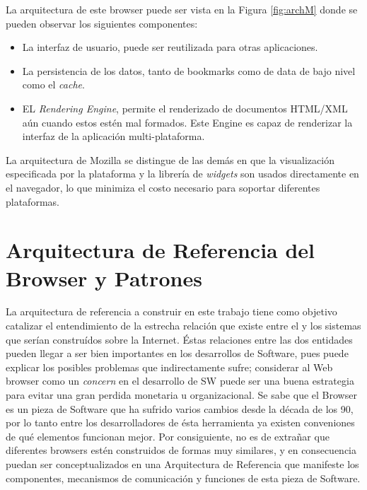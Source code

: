     La arquitectura de este browser puede ser vista en la Figura \ref{fig:archM} donde se pueden observar los siguientes componentes:
            \begin{itemize}
                \item La interfaz de usuario, puede ser reutilizada para otras aplicaciones.
                \item La persistencia de los datos, tanto de bookmarks como de data de bajo nivel como el \textit{cache}.
                \item EL \textit{Rendering Engine}, permite el renderizado de documentos HTML/XML aún cuando estos estén mal formados. Este Engine es capaz de renderizar la interfaz de la aplicación multi-plataforma.
            \end{itemize}
    La arquitectura de Mozilla se distingue de las demás en que la visualización especificada por la plataforma y la librería de \textit{widgets} son usados directamente en el navegador, lo que minimiza el costo necesario para soportar diferentes plataformas.
            




\section{Arquitectura de Referencia del Browser y Patrones}
\label{chap3:ArqRefBrowandPatt}


La arquitectura de referencia a construir en este trabajo tiene como objetivo catalizar el entendimiento de la estrecha relación que existe entre el \cite{Web Browser} y los sistemas que serían construídos sobre la Internet. Éstas relaciones entre las dos entidades pueden llegar a ser bien importantes en los desarrollos de Software, pues puede explicar los posibles problemas que indirectamente sufre; considerar al Web browser como un \textit{concern} en el desarrollo de SW puede ser una buena estrategia para evitar una gran perdida monetaria u organizacional. Se sabe que el Browser es un pieza de Software que ha sufrido varios cambios desde la década de los 90, por lo tanto entre los desarrolladores de ésta herramienta ya existen conveniones de qué elementos funcionan mejor. Por consiguiente, no es de extrañar que diferentes browsers estén construidos de formas muy similares, y en consecuencia puedan ser conceptualizados en una Arquitectura de Referencia que manifeste los componentes, mecanismos de comunicación y funciones de esta pieza de Software.

